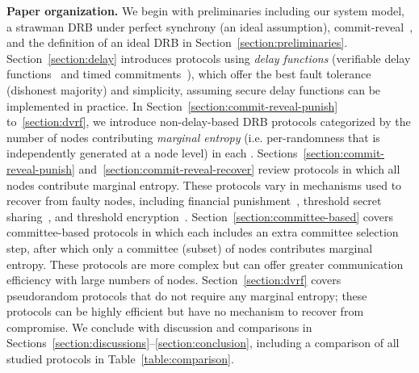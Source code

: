 \textbf{Paper organization.} We begin with preliminaries including our system model, a strawman DRB under perfect synchrony (an ideal assumption), commit-reveal~\cite{blum1983coin}, and the definition of an ideal DRB in Section~\ref{section:preliminaries}. Section~\ref{section:delay} introduces protocols using \textit{delay functions} (verifiable delay functions~\cite{boneh2018verifiable} and timed commitments~\cite{boneh2000timed}), which offer the best fault tolerance (dishonest majority) and simplicity, assuming secure delay functions can be implemented in practice. In Section~\ref{section:commit-reveal-punish} to~\ref{section:dvrf}, we introduce non-delay-based DRB protocols categorized by the number of nodes contributing \textit{marginal entropy} (i.e. per-\epoch randomness that is independently generated at a node level) in each \epoch. Sections~\ref{section:commit-reveal-punish} and~\ref{section:commit-reveal-recover} review protocols in which all nodes contribute marginal entropy. These protocols vary in mechanisms used to recover from faulty nodes, including financial punishment~\cite{youcai2017randao, david2020economically}, threshold secret sharing~\cite{schoenmakers1999simple, cascudo2017scrape}, and threshold encryption~\cite{desmedt1990Threshold}. Section~\ref{section:committee-based} covers committee-based protocols in which each \epoch includes an extra committee selection step, after which only a committee (subset) of nodes contributes marginal entropy. These protocols are more complex but can offer greater communication efficiency with large numbers of nodes. Section~\ref{section:dvrf} covers pseudorandom protocols that do not require any marginal entropy; these protocols can be highly efficient but have no mechanism to recover from compromise. We conclude with discussion and comparisons in Sections~\ref{section:discussions}--\ref{section:conclusion}, including a comparison of all studied protocols in Table~\ref{table:comparison}.

